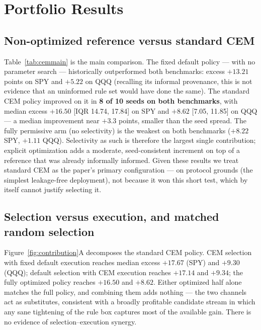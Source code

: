 \documentclass[sigconf,anonymous]{acmart}
\begin{document}
\section{Portfolio Results}

\subsection{Non-optimized reference versus standard CEM}

Table~\ref{tab:cemmain} is the main comparison. The fixed default policy --- with no parameter search --- historically outperformed both benchmarks: excess $+13.21$ points on SPY and $+5.22$ on QQQ (recalling its informal provenance, this is not evidence that an uninformed rule set would have done the same). The standard CEM policy improved on it in \textbf{8 of 10 seeds on both benchmarks}, with median excess $+16.50$ [IQR 14.74, 17.84] on SPY and $+8.62$ [7.05, 11.85] on QQQ --- a median improvement near $+3.3$ points, smaller than the seed spread. The fully permissive arm (no selectivity) is the weakest on both benchmarks ($+8.22$ SPY, $+1.11$ QQQ). Selectivity as such is therefore the largest single contribution; explicit optimization adds a moderate, seed-consistent increment on top of a reference that was already informally informed. Given these results we treat standard CEM as the paper's primary configuration --- on protocol grounds (the simplest leakage-free deployment), not because it won this short test, which by itself cannot justify selecting it.



\subsection{Selection versus execution, and matched random selection}

Figure~\ref{fig:contribution}A decomposes the standard CEM policy. CEM selection with fixed default execution reaches median excess $+17.67$ (SPY) and $+9.30$ (QQQ); default selection with CEM execution reaches $+17.14$ and $+9.34$; the fully optimized policy reaches $+16.50$ and $+8.62$. Either optimized half alone matches the full policy, and combining them adds nothing --- the two channels act as substitutes, consistent with a broadly profitable candidate stream in which any sane tightening of the rule box captures most of the available gain. There is no evidence of selection--execution synergy.
\end{document}
